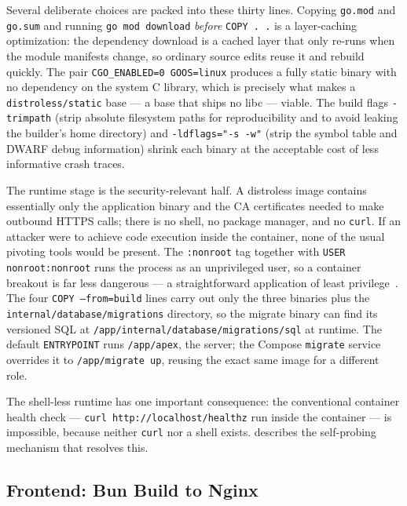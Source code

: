 Several deliberate choices are packed into these thirty lines. Copying \texttt{go.mod} and \texttt{go.sum} and running \texttt{go mod download} \emph{before} \texttt{COPY . .} is a layer-caching optimization: the dependency download is a cached layer that only re-runs when the module manifests change, so ordinary source edits reuse it and rebuild quickly. The pair \texttt{CGO\_ENABLED=0 GOOS=linux} produces a fully static binary with no dependency on the system C library, which is precisely what makes a \texttt{distroless/static} base --- a base that ships no libc --- viable. The build flags \texttt{-trimpath} (strip absolute filesystem paths for reproducibility and to avoid leaking the builder's home directory) and \texttt{-ldflags="-s -w"} (strip the symbol table and DWARF debug information) shrink each binary at the acceptable cost of less informative crash traces.

The runtime stage is the security-relevant half. A distroless image contains essentially only the application binary and the CA certificates needed to make outbound HTTPS calls; there is no shell, no package manager, and no \texttt{curl}. If an attacker were to achieve code execution inside the container, none of the usual pivoting tools would be present. The \texttt{:nonroot} tag together with \texttt{USER nonroot:nonroot} runs the process as an unprivileged user, so a container breakout is far less dangerous --- a straightforward application of least privilege~\cite{distroless,docker}. The four \texttt{COPY --from=build} lines carry out only the three binaries plus the \texttt{internal/database/migrations} directory, so the migrate binary can find its versioned SQL at \texttt{/app/internal/database/migrations/sql} at runtime. The default \texttt{ENTRYPOINT} runs \texttt{/app/apex}, the server; the Compose \texttt{migrate} service overrides it to \texttt{/app/migrate up}, reusing the exact same image for a different role.

The shell-less runtime has one important consequence: the conventional container health check --- \texttt{curl http://localhost/healthz} run inside the container --- is impossible, because neither \texttt{curl} nor a shell exists.  describes the self-probing mechanism that resolves this.

\subsection{Frontend: Bun Build to Nginx}\label{sec:ch10-frontend-image}

